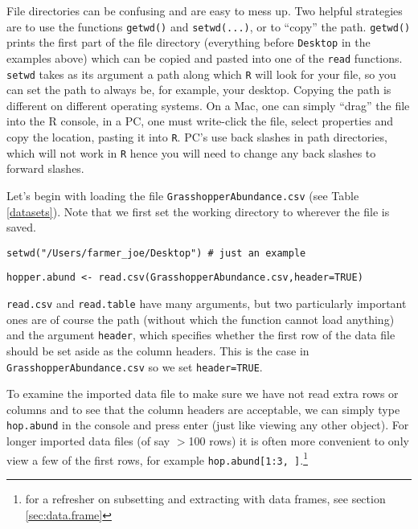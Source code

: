 \documentclass[12pt]{article}
\newcommand{\R}[1] {
	\item \texttt{#1}
}
\newenvironment{verbatim}{ 
	\indent
	\begin{list}{}{\setlength{\itemsep}{-1.5mm}}
}{
	\end{list}
}
\begin{document}
File directories can be confusing and are easy to mess up.  Two helpful strategies are to use the functions \verb+getwd()+ and \verb+setwd(...)+, or to ``copy'' the path.  \verb+getwd()+ prints the first part of the file directory (everything before \verb+Desktop+ in the examples above) which can be copied and pasted into one of the \verb+read+ functions.  \verb+setwd+ takes as its argument a path along which \verb+R+ will look for your file, so you can set the path to always be, for example, your desktop.  Copying the path is different on different operating systems.  On a Mac, one can simply ``drag'' the file into the R console, in a PC, one must write-click the file, select properties and copy the location, pasting it into \verb+R+.  PC's use back slashes in path directories, which will not work in \verb+R+ hence you will need to change any back slashes to forward slashes.

Let's begin with loading the file \verb+GrasshopperAbundance.csv+ (see Table \ref{datasets}). Note that we first set the working directory to wherever the file is saved.
\begin{verbatim}
	\R{setwd("/Users/farmer\_joe/Desktop")	\# just an example}
	\R{hopper.abund <- read.csv(GrasshopperAbundance.csv,header=TRUE)}
\end{verbatim}
\verb+read.csv+ and \verb+read.table+ have many arguments, but two particularly important ones are of course the path (without which the function cannot load anything) and the argument \verb+header+, which specifies whether the first row of the data file should be set aside as the column headers.  This is the case in \verb+GrasshopperAbundance.csv+ so we set \verb+header=TRUE+.

To examine the imported data file to make sure we have not read extra rows or columns and to see that the column headers are acceptable, we can simply type \verb+hop.abund+ in the console and press enter (just like viewing any other object).  For longer imported data files (of say $>$100 rows) it is often more convenient to only view a few of the first rows, for example \verb+hop.abund[1:3, ]+.\footnote{for a refresher on subsetting and extracting with data frames, see section \ref{sec:data.frame}}
\end{document}
